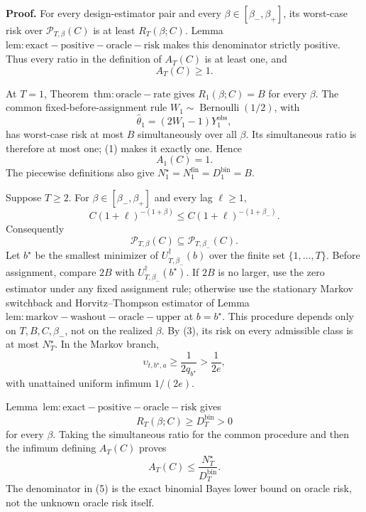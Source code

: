 \textbf{Proof.} For every design-estimator pair and every \(\beta\in[\beta_-,\beta_+]\), its worst-case risk over \(\mathcal P_{T,\beta}(C)\) is at least \(R_T(\beta;C)\). Lemma~\(\mathrm{lem:exact-positive-oracle-risk}\) makes this denominator strictly positive. Thus every ratio in the definition of \(A_T(C)\) is at least one, and
\[
A_T(C)\ge1.
\tag{1}
\]

At \(T=1\), Theorem~\(\mathrm{thm:oracle-rate}\) gives \(R_1(\beta;C)=B\) for every \(\beta\). The common fixed-before-assignment rule \(W_1\sim\operatorname{Bernoulli}(1/2)\), with
\[
\widehat\theta_1=(2W_1-1)Y_1^{\mathrm{obs}},
\]
has worst-case risk at most \(B\) simultaneously over all \(\beta\). Its simultaneous ratio is therefore at most one; (1) makes it exactly one. Hence
\[
A_1(C)=1.
\tag{2}
\]
The piecewise definitions also give \(N_1^\star=N_1^{\mathrm{fin}}=D_1^{\mathrm{bin}}=B\).

Suppose \(T\ge2\). For \(\beta\in[\beta_-,\beta_+]\) and every lag \(\ell\ge1\),
\[
C(1+\ell)^{-(1+\beta)}
\le C(1+\ell)^{-(1+\beta_-)}.
\]
Consequently
\[
\mathcal P_{T,\beta}(C)\subseteq\mathcal P_{T,\beta_-}(C).
\tag{3}
\]
Let \(b^\star\) be the smallest minimizer of \(U_{T,\beta_-}^{\dagger}(b)\) over the finite set \(\{1,\ldots,T\}\). Before assignment, compare \(2B\) with \(U_{T,\beta_-}^{\dagger}(b^\star)\). If \(2B\) is no larger, use the zero estimator under any fixed assignment rule; otherwise use the stationary Markov switchback and Horvitz--Thompson estimator of Lemma~\(\mathrm{lem:markov-washout-oracle-upper}\) at \(b=b^\star\). This procedure depends only on \(T,B,C,\beta_-\), not on the realized \(\beta\). By (3), its risk on every admissible class is at most \(N_T^\star\). In the Markov branch,
\[
\upsilon_{t,b^\star,a}\ge\frac{1}{2q_{b^\star}}>\frac{1}{2e},
\]
with unattained uniform infimum \(1/(2e)\).

Lemma~\(\mathrm{lem:exact-positive-oracle-risk}\) gives
\[
R_T(\beta;C)\ge D_T^{\mathrm{bin}}>0
\tag{4}
\]
for every \(\beta\). Taking the simultaneous ratio for the common procedure and then the infimum defining \(A_T(C)\) proves
\[
A_T(C)\le\frac{N_T^\star}{D_T^{\mathrm{bin}}}.
\tag{5}
\]
The denominator in (5) is the exact binomial Bayes lower bound on oracle risk, not the unknown oracle risk itself.

